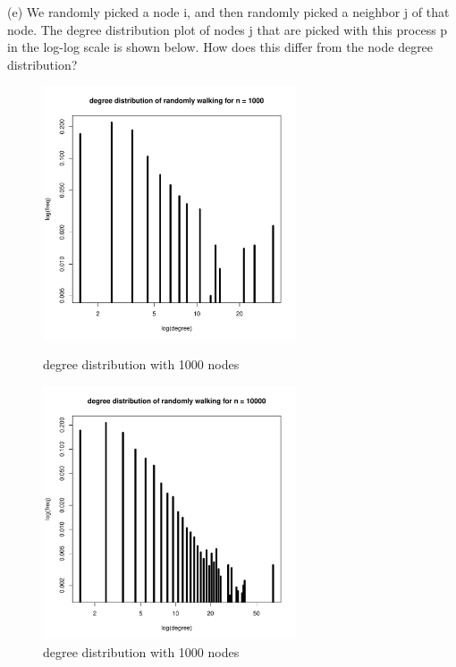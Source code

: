 \documentclass[draftcls,12pt,onecolumn]{IEEEtran}
\begin{document}
(e) We randomly picked a node i, and then randomly picked a neighbor j of that node. The degree distribution plot of nodes j that are picked with this process p in the log-log scale is shown below. 
How does this differ from the node degree distribution?
\begin{figure}[htbp]
\centering
\begin{minipage}[t]{0.48\textwidth}
\centering
\includegraphics[width=7.5cm]{1_2_e_degsmall.pdf}
\caption{degree distribution with 1000 nodes}
\end{minipage}
\begin{minipage}[t]{0.48\textwidth}
\centering
\includegraphics[width=7.5cm]{1_2_e_deglarge.pdf}
\caption{degree distribution with 1000 nodes}
\end{minipage}
\end{figure}
\end{document}
